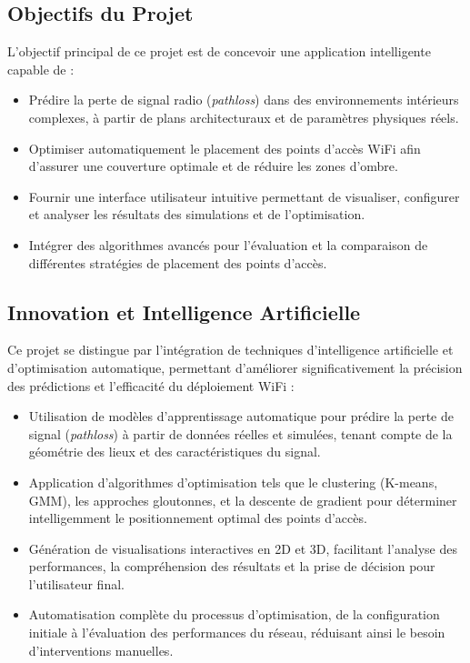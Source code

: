 \documentclass[12pt,a4paper]{article}
\begin{document}
\subsection{Objectifs du Projet}
L’objectif principal de ce projet est de concevoir une application intelligente capable de :

\begin{itemize}
\item Prédire la perte de signal radio (\textit{pathloss}) dans des environnements intérieurs complexes, à partir de plans architecturaux et de paramètres physiques réels.
\item Optimiser automatiquement le placement des points d’accès WiFi afin d’assurer une couverture optimale et de réduire les zones d’ombre.
\item Fournir une interface utilisateur intuitive permettant de visualiser, configurer et analyser les résultats des simulations et de l’optimisation.
\item Intégrer des algorithmes avancés pour l’évaluation et la comparaison de différentes stratégies de placement des points d’accès.
\end{itemize}

\subsection{Innovation et Intelligence Artificielle}
Ce projet se distingue par l’intégration de techniques d’intelligence artificielle et d’optimisation automatique, permettant d'améliorer significativement la précision des prédictions et l'efficacité du déploiement WiFi :

\begin{itemize}
\item Utilisation de modèles d’apprentissage automatique pour prédire la perte de signal (\textit{pathloss}) à partir de données réelles et simulées, tenant compte de la géométrie des lieux et des caractéristiques du signal.

\item Application d’algorithmes d’optimisation tels que le clustering (K-means, GMM), les approches gloutonnes, et la descente de gradient pour déterminer intelligemment le positionnement optimal des points d’accès.

\item Génération de visualisations interactives en 2D et 3D, facilitant l’analyse des performances, la compréhension des résultats et la prise de décision pour l’utilisateur final.

\item Automatisation complète du processus d’optimisation, de la configuration initiale à l’évaluation des performances du réseau, réduisant ainsi le besoin d’interventions manuelles.
\end{itemize}
\end{document}
